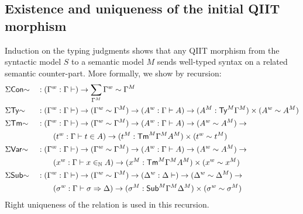 \subsection{Existence and uniqueness of the initial QIIT morphism}
Induction on the typing judgments shows that any QIIT morphism from the
syntactic model $S$  to a semantic model $M$ sends well-typed syntax on a related
semantic counter-part. More formally, we show by recursion:
  \begin{alignat*}{5}
     & \Sigma\mathsf{Con}{\sim} && :
    ({\Gamma}^w : \Gamma \vdash ) \rightarrow
    \sum_{{\Gamma}^M} {\Gamma}^w \sim {\Gamma}^M
    \\
     & \Sigma\mathsf{Ty}{\sim} && :
    ({\Gamma}^w : \Gamma \vdash ) \rightarrow
    ({\Gamma}^w\sim {\Gamma}^M) \rightarrow
    ({A}^w : \Gamma \vdash A ) \rightarrow
    ({{A}^M:{\mathsf{Ty}}^M{\Gamma}^M})\times ( {A}^w \sim {A}^M)
    \\
     & \Sigma\mathsf{Tm}{\sim} && :
    ({\Gamma}^w : \Gamma \vdash ) \rightarrow
    ({\Gamma}^w\sim {\Gamma}^M) \rightarrow
    ({A}^w : \Gamma \vdash A ) \rightarrow
    ( {A}^w \sim {A}^M) \rightarrow
    \\ & && \qquad
    ({t}^w : \Gamma \vdash t \in A ) \rightarrow
    ({{t}^M:{\mathsf{Tm}}^M{\Gamma}^M}{A}^M)\times ( {t}^w \sim {t}^M)
    \\
     & \Sigma\mathsf{Var}{\sim} && :
    ({\Gamma}^w : \Gamma \vdash ) \rightarrow
    ({\Gamma}^w\sim {\Gamma}^M) \rightarrow
    ({A}^w : \Gamma \vdash A ) \rightarrow
    ( {A}^w \sim {A}^M) \rightarrow
    \\ & && \qquad
    ({x}^w : \Gamma \vdash x \in_{\mathbb{N}} A ) \rightarrow
    ({{x}^M:{\mathsf{Tm}}^M{\Gamma}^M}{A}^M)\times ( {x}^w \sim {x}^M)
    \\
     & \Sigma\mathsf{Sub}{\sim} && :
    ({\Gamma}^w : \Gamma \vdash ) \rightarrow
    ({\Gamma}^w\sim {\Gamma}^M) \rightarrow
    ({\Delta}^w : \Delta \vdash  ) \rightarrow
    ( {\Delta}^w \sim {\Delta}^M) \rightarrow
    \\ & && \qquad
    ({\sigma}^w : \Gamma \vdash \sigma \Rightarrow \Delta ) \rightarrow
    ({{\sigma}^M:{\mathsf{Sub}}^M{\Gamma}^M}{\Delta}^M)\times ( {\sigma}^w \sim {\sigma}^M)
  \end{alignat*}
  Right uniqueness of the relation is used in this recursion.


